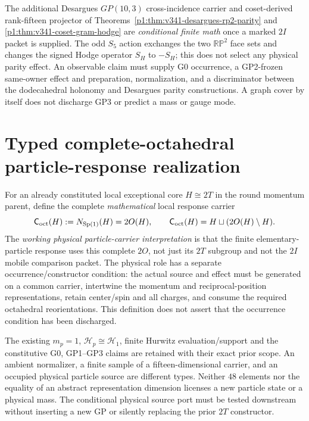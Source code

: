 \documentclass[12pt,a4paper]{article}
\begin{document}
\begin{remark}
\label{p2a:rem:v341-desargues-occurrence-firewall}
The additional Desargues $GP(10,3)$ cross-incidence carrier and
coset-derived rank-fifteen projector of
Theorems~\ref{p1:thm:v341-desargues-rp2-parity} and
\ref{p1:thm:v341-coset-gram-hodge} are \emph{conditional finite
math} once a marked $2I$ packet is supplied.  The odd $S_5$
action exchanges the two $\mathbb{RP}^2$ face sets and changes
the signed Hodge operator $S_H$ to $-S_H$; this does not select
any physical parity effect.  An observable claim must supply
G0 occurrence, a GP2-frozen same-owner effect and preparation,
normalization, and a discriminator between the dodecahedral
holonomy and Desargues parity constructions.  A graph cover by
itself does not discharge GP3 or predict a mass or gauge mode.
\end{remark}


\section{Typed complete-octahedral particle-response realization}
\label{p2a:sec:v3222-octahedral-particle-role}
\begin{definition}
\label{p2a:def:v3222-particle-octahedral-role}
For an already constituted local exceptional core $H\cong2T$ in the
round momentum parent, define the complete \emph{mathematical} local
response carrier
\[
 \mathsf C_{\rm oct}(H):=N_{\operatorname{Sp}(1)}(H)=2O(H),
 \qquad \mathsf C_{\rm oct}(H)=H\sqcup(2O(H)\setminus H).
\]
The \emph{working physical particle-carrier interpretation} is that
the finite elementary-particle response uses this complete $2O$,
not just its $2T$ subgroup and not the $2I$ mobile comparison packet.
The physical role has a separate occurrence/constructor condition:
the actual source and effect must be generated on a common carrier,
intertwine the momentum and reciprocal-position representations,
retain center/spin and all charges, and consume the required octahedral
reorientations.  This definition does not assert that the occurrence
condition has been discharged.
\end{definition}
\begin{remark}
\label{p2a:rem:v3222-octahedral-role-firewall}
The existing $m_p=1$, $\mathcal H_p\cong\mathcal H_1$, finite
Hurwitz evaluation/support and the constitutive G0, GP1--GP3
claims are retained with their exact prior scope.  An ambient
normalizer, a finite sample of a fifteen-dimensional carrier,
and an occupied physical particle source are different types.
Neither $48$ elements nor the equality of an abstract representation
dimension licenses a new particle state or a physical mass.  The
conditional physical source port must be tested downstream without
inserting a new GP or silently replacing the prior $2T$ constructor.
\end{remark}
\end{document}
